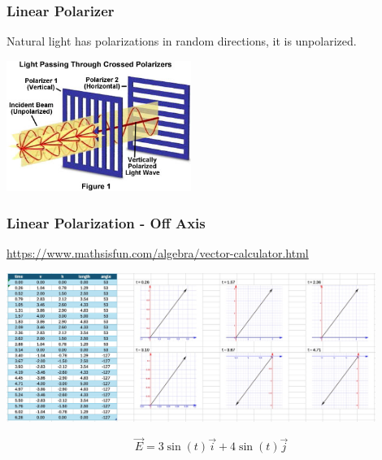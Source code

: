 \documentclass{beamer}
\begin{document}
\begin{frame}\frametitle{Linear Polarizer}

Natural light has polarizations in random directions, it is unpolarized.

\begin{center}
\includegraphics[width=6cm]{fig/polarizer.jpg}
\end{center}

\end{frame}


\begin{frame}\frametitle{Linear Polarization - Off Axis}

\url{https://www.mathsisfun.com/algebra/vector-calculator.html}

\begin{center}
\includegraphics[width=12cm]{fig/pol1.jpg}
\end{center}

\begin{equation}
\vec{E} = 3 \sin{(t)} \vec{i} + 4 \sin{(t)} \vec{j}
\end{equation}

\end{frame}
\end{document}
